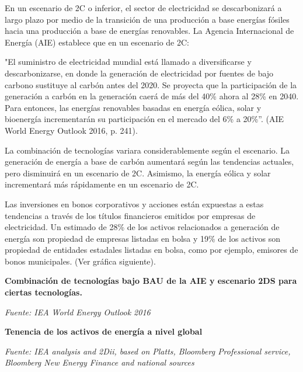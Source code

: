 \documentclass[10pt,table]{article}\usepackage[]{graphicx}\usepackage[]{color}
\begin{document}
\begin{multicols}{2}
	En un escenario de 2\degree C o inferior, el sector de electricidad se descarbonizará a largo plazo por medio de la transición de una producción a base energías fósiles hacia una producción a base de energías renovables. La Agencia Internacional de Energía (AIE) establece que en un escenario de 2\degree C:
		
	"El suministro de electricidad mundial está llamado a diversificarse y descarbonizarse, en donde la generación de electricidad por fuentes de bajo carbono sustituye al carbón antes del 2020. Se proyecta que la participación de la generación a carbón en la generación caerá de más del 40\% ahora al 28\% en 2040. Para entonces, las energías renovables basadas en energía eólica, solar y bioenergía incrementarán su participación en el mercado del 6\% a 20\%”. (AIE World Energy Outlook 2016, p. 241).
		
	La combinación de tecnologías variara considerablemente según el escenario. La generación de energía a base de carbón aumentará según las tendencias actuales, pero disminuirá en un escenario de 2\degree C. Asimismo, la energía eólica y solar incrementará más rápidamente en un escenario de 2\degree C.
		
	Las inversiones en bonos corporativos y acciones están expuestas a estas tendencias a través de los títulos financieros emitidos por empresas de electricidad. Un estimado de 28\% de los activos relacionados a generación de energía son propiedad de empresas listadas en bolsa y 19\% de los activos son propiedad de entidades estadales listadas en bolsa, como por ejemplo, emisores de bonos municipales. (Ver gráfica siguiente).
		
		
	\end{multicols}
	
	\begin{multicols}{2}
		
		\vspace{-.2cm}
		\textbf{Combinación de tecnologías bajo BAU de la AIE y escenario 2DS para ciertas tecnologías. }
		
		
		
		
		
		\textit{\small Fuente: IEA World Energy Outlook 2016
		}
		
		\textbf{Tenencia de los activos de energía a nivel global}
		\newline
		
		
		\textit{\small Fuente: IEA analysis and 2Dii, based on Platts, Bloomberg Professional service, Bloomberg New Energy Finance and national sources
		}
		
	\end{multicols}
\end{document}
